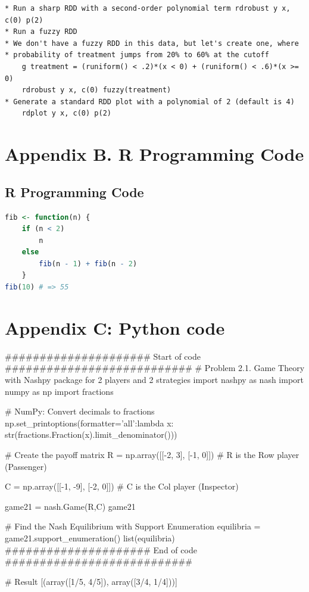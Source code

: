 \documentclass[a4paper, 12pt]{report}
\begin{document}
\begin{lstlisting}
* Run a sharp RDD with a second-order polynomial term rdrobust y x, c(0) p(2)
* Run a fuzzy RDD
* We don't have a fuzzy RDD in this data, but let's create one, where
* probability of treatment jumps from 20% to 60% at the cutoff
    g treatment = (runiform() < .2)*(x < 0) + (runiform() < .6)*(x >= 0)
    rdrobust y x, c(0) fuzzy(treatment)
* Generate a standard RDD plot with a polynomial of 2 (default is 4)
    rdplot y x, c(0) p(2)
\end{lstlisting}
    
\section*{Appendix B. R Programming Code}\label{appendixb}
\subsection*{R Programming Code}

\begin{lstlisting}[language=R]
fib <- function(n) {
    if (n < 2)
        n
    else
        fib(n - 1) + fib(n - 2)
    }
fib(10) # => 55
\end{lstlisting}

\section*{Appendix C: Python code}\label{appendixc}
\begin{python}
##################### Start of code ###########################
# Problem 2.1. Game Theory with Nashpy package for 2 players and 2 strategies
import nashpy as nash
import numpy as np
import fractions
        
# NumPy: Convert decimals to fractions
np.set_printoptions(formatter={'all':lambda x: str(fractions.Fraction(x).limit_denominator())})
        
# Create the payoff matrix
R = np.array([[-2, 3],
             [-1, 0]]) # R is the Row player (Passenger)
        
C = np.array([[-1, -9],
             [-2,  0]]) # C is the Col player (Inspector)
        
game21 = nash.Game(R,C)
game21
        
# Find the Nash Equilibrium with Support Enumeration
equilibria = game21.support_enumeration()
list(equilibria)
##################### End of code ###########################

# Result
[(array([1/5, 4/5]), array([3/4, 1/4]))]
\end{python} 


\pagebreak \newpage

    \singlespacing
    
    
\end{document}
